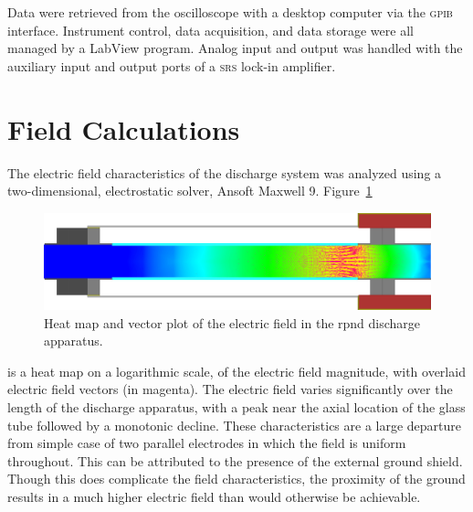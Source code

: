 Data were retrieved from the oscilloscope with a desktop computer via the
\textsc{gpib} interface. Instrument control, data acquisition, and data storage
were all managed by a LabView program. Analog input and output was handled with
the auxiliary input and output ports of a \textsc{srs} 
lock-in amplifier.

\section{Field Calculations}

The electric field characteristics of the discharge system was analyzed using a
two-dimensional, electrostatic solver, Ansoft Maxwell 9. Figure~\ref{fig:fields}
\begin{figure}
  \centering
  \includegraphics{./chapters/experiment/figures/fields.jpg}
  \caption{Heat map and vector plot of the electric field in the \acs{rpnd}
  discharge apparatus.}
  \label{fig:fields}
\end{figure}
is a heat map on a logarithmic scale, of the electric field magnitude, with
overlaid electric field vectors (in magenta). The electric field varies
significantly over the length of the discharge apparatus, with a peak near the
axial location of the glass tube followed by a monotonic decline. These
characteristics are a large departure from simple case of two parallel
electrodes in which the field is uniform throughout. This can be attributed to
the presence of the external ground shield. Though this does complicate the
field characteristics, the proximity of the ground results in a much higher
electric field than would otherwise be achievable.

